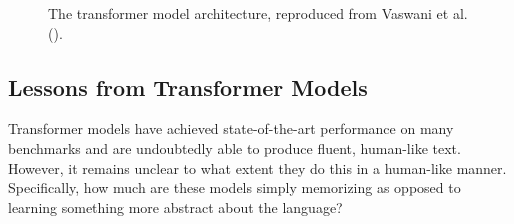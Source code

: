 \documentclass[
  12pt,
  letterpaper,
]{scrreprt}
\begin{document}
\begin{figure}[htbp]

\caption{\label{fig-transformermodel}The transformer model architecture,
reproduced from Vaswani et al.
().}


\end{figure}%

\subsection{Lessons from Transformer
Models}\label{lessons-from-transformer-models}

Transformer models have achieved state-of-the-art performance on many
benchmarks and are undoubtedly able to produce fluent, human-like text.
However, it remains unclear to what extent they do this in a human-like
manner. Specifically, how much are these models simply memorizing as
opposed to learning something more abstract about the language?
\end{document}
